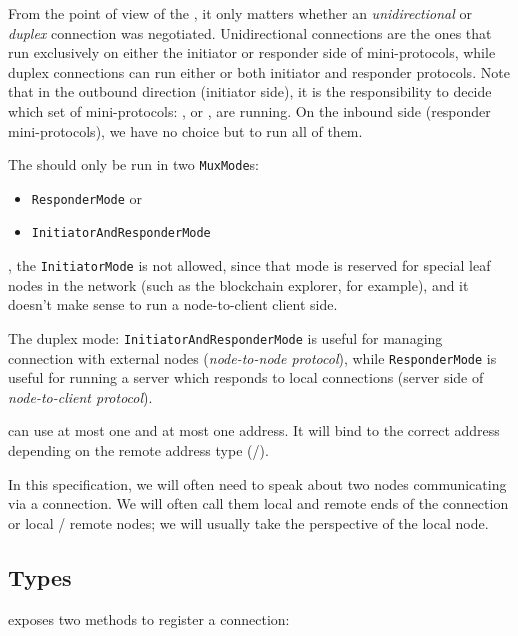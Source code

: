 From the point of view of the \connmngr{}, it only
matters whether an \emph{unidirectional} or \emph{duplex} connection was negotiated.
Unidirectional connections are the ones that run exclusively on either the initiator or responder
side of mini-protocols, while duplex connections can run either or
both initiator and responder protocols. Note that in the outbound direction (initiator side),
it is the \ptopgov{} responsibility to decide which set of mini-protocols:
\established{}, \warm{} or \hot{}, are running. On the inbound side (responder
mini-protocols), we have no choice but to run all of them.

The \connmngr{} should only be run in two \texttt{MuxMode}s:

\begin{itemize}
  \item \texttt{ResponderMode} or
  \item \texttt{InitiatorAndResponderMode}
\end{itemize}

\noindent, the \texttt{InitiatorMode} is not allowed, since that mode is reserved for
special leaf nodes in the network (such as the blockchain explorer, for example), and it doesn't make
sense to run a node-to-client client side.

The duplex mode: \texttt{InitiatorAndResponderMode} is useful for managing
connection with external nodes (\textit{node-to-node protocol}), while
\texttt{ResponderMode} is useful for running a server which responds to local
connections (server side of \textit{node-to-client protocol}).


\Connmngr{} can use at most one \ipvfour{} and at most one \ipvsix{}
address. It will bind to the correct address depending on the remote address
type (\ipvfour{}/\ipvsix{}).

In this specification, we will often need to speak about two nodes communicating
via a \TCP{} connection.  We will often call them local and remote ends of the
connection or local \slash{} remote nodes; we will usually take the
perspective of the local node.


\subsection{Types} %

\Connmngr{} exposes two methods to register a connection:

